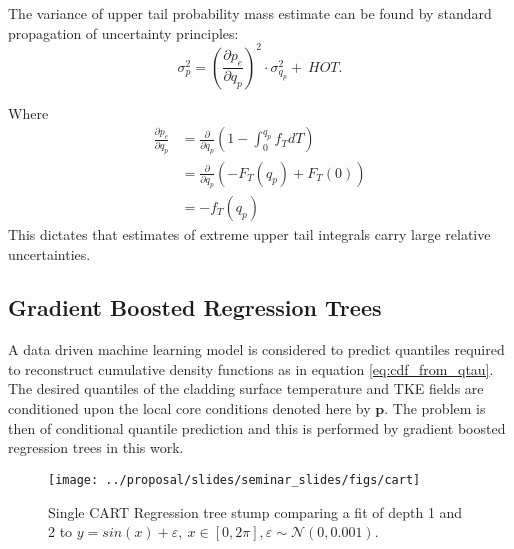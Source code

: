     The variance of upper tail probability mass estimate can be found by standard propagation of uncertainty principles:
   \begin{equation}
    \sigma_p^2 = \left(\frac{\partial p_e}{\partial q_p} \right)^2 \cdot \sigma_{q_p}^2 +\  HOT.
    \label{eq:pr_thresh_uncert}
    \end{equation}

    Where
   \begin{eqnarray}
    \frac{\partial p_e}{\partial q_p} &= \frac{\partial}{\partial q_p} \left( 1 - \int_0^{q_p} f_T dT \right) \nonumber \\
    &= \frac{\partial}{\partial q_p} \left( -F_T(q_p) + F_T(0) \right) \nonumber \\
    &= -f_T(q_p)
    \end{eqnarray}
    This dictates that estimates of extreme upper tail integrals carry large relative uncertainties.



\subsection{Gradient Boosted Regression Trees}
\label{chap:GBRT}

A data driven machine learning model is considered to predict quantiles required to reconstruct cumulative density functions as in equation \ref{eq:cdf_from_qtau}.  The desired quantiles of the cladding surface temperature and TKE fields are conditioned upon the local core conditions denoted here by $\mathbf p$.  The problem is then of conditional quantile prediction and this is performed by gradient boosted regression trees in this work.

\begin{figure}[H]
    \centering
    \texttt{[image: ../proposal/slides/seminar\_slides/figs/cart]}
    \caption[Regression tree stump.]{Single CART Regression tree stump comparing a fit of depth 1 and 2 to $y=sin(x) + \varepsilon,\ x\in[0,2\pi], \varepsilon \sim \mathcal N(0,0.001)$.}
    \label{fig:cart}
\end{figure}

